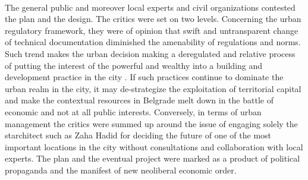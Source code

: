 \documentclass[11pt]{report}
\begin{document}
\begin{itemize}
\\
The general public and moreover local experts and civil organizations contested the plan and the design. The critics were set on two levels. Concerning the urban regulatory framework, they were of opinion that swift and untransparent change of technical documentation diminished the amenability of regulations and norms. Such trend makes the urban decision making a deregulated and relative process of putting the interest of the powerful and wealthy into a building and development practice in the city \cite{Vukmirovic in Doytchinov et al 2015}. If such practices continue to dominate the urban realm in the city, it may de-strategize the exploitation of territorial capital and make the contextual resources in Belgrade melt down in the battle of economic and not at all public interests.
Conversely, in terms of urban management the critics were summed up around the issue of engaging solely the starchitect such as Zaha Hadid for deciding the future of one of the most important locations in the city without consultations and collaboration with local experts. 
The plan and the eventual project were marked as a product of political propaganda and the manifest of new neoliberal economic order.


\end{itemize}
\end{document}
